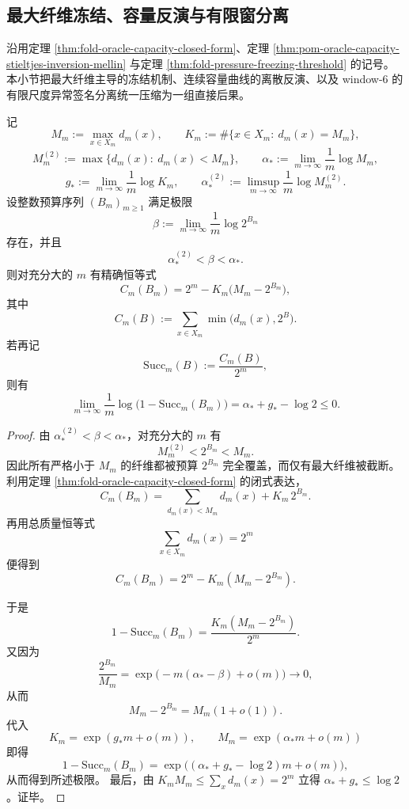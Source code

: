 \subsection{最大纤维冻结、容量反演与有限窗分离}\label{subsec:conclusion-maxfiber-freezing-capacity-entropy-separation}
沿用定理 \ref{thm:fold-oracle-capacity-closed-form}、定理 \ref{thm:pom-oracle-capacity-stieltjes-inversion-mellin} 与定理 \ref{thm:fold-pressure-freezing-threshold} 的记号。
本小节把最大纤维主导的冻结机制、连续容量曲线的离散反演、以及 window-\(6\) 的有限尺度异常签名分离统一压缩为一组直接后果。

\begin{theorem}[亚极大预算区间中的预言机容量平台律]\label{thm:conclusion-subcritical-maxfiber-capacity-platform}
记
\[
M_m:=\max_{x\in X_m}d_m(x),
\qquad
K_m:=\#\{x\in X_m:\ d_m(x)=M_m\},
\]
\[
M_m^{(2)}:=\max\{d_m(x):\ d_m(x)<M_m\},
\qquad
\alpha_\ast:=\lim_{m\to\infty}\frac{1}{m}\log M_m,
\]
\[
g_\ast:=\lim_{m\to\infty}\frac{1}{m}\log K_m,
\qquad
\alpha_\ast^{(2)}:=\limsup_{m\to\infty}\frac{1}{m}\log M_m^{(2)}.
\]
设整数预算序列 \((B_m)_{m\ge 1}\) 满足极限
\[
\beta:=\lim_{m\to\infty}\frac{1}{m}\log 2^{B_m}
\]
存在，并且
\[
\alpha_\ast^{(2)}<\beta<\alpha_\ast.
\]
则对充分大的 \(m\) 有精确恒等式
\[
C_m(B_m)=2^m-K_m\bigl(M_m-2^{B_m}\bigr),
\]
其中
\[
C_m(B):=\sum_{x\in X_m}\min\bigl(d_m(x),2^B\bigr).
\]
若再记
\[
\mathrm{Succ}_m(B):=\frac{C_m(B)}{2^m},
\]
则有
\[
\lim_{m\to\infty}\frac{1}{m}\log\bigl(1-\mathrm{Succ}_m(B_m)\bigr)
=
\alpha_\ast+g_\ast-\log 2
\le 0.
\]
\end{theorem}
\begin{proof}
由 \(\alpha_\ast^{(2)}<\beta<\alpha_\ast\)，对充分大的 \(m\) 有
\[
M_m^{(2)}<2^{B_m}<M_m.
\]
因此所有严格小于 \(M_m\) 的纤维都被预算 \(2^{B_m}\) 完全覆盖，而仅有最大纤维被截断。
利用定理 \ref{thm:fold-oracle-capacity-closed-form} 的闭式表达，
\[
C_m(B_m)
=
\sum_{d_m(x)<M_m}d_m(x)+K_m\,2^{B_m}.
\]
再用总质量恒等式
\[
\sum_{x\in X_m}d_m(x)=2^m
\]
便得到
\[
C_m(B_m)=2^m-K_m(M_m-2^{B_m}).
\]

于是
\[
1-\mathrm{Succ}_m(B_m)=\frac{K_m(M_m-2^{B_m})}{2^m}.
\]
又因为
\[
\frac{2^{B_m}}{M_m}
=
\exp\!\bigl(-m(\alpha_\ast-\beta)+o(m)\bigr)\to 0,
\]
从而
\[
M_m-2^{B_m}=M_m(1+o(1)).
\]
代入
\[
K_m=\exp(g_\ast m+o(m)),
\qquad
M_m=\exp(\alpha_\ast m+o(m))
\]
即得
\[
1-\mathrm{Succ}_m(B_m)
=
\exp\!\bigl((\alpha_\ast+g_\ast-\log 2)m+o(m)\bigr),
\]
从而得到所述极限。
最后，由 \(K_mM_m\le \sum_x d_m(x)=2^m\) 立得 \(\alpha_\ast+g_\ast\le \log 2\)。证毕。
\end{proof}

